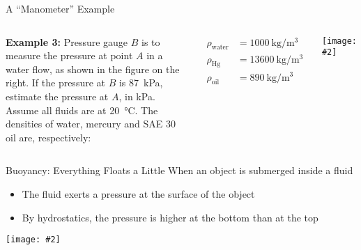 \documentclass[12pt,aspectratio=169]{beamer}
\newcommand{\pic}[2]{\texttt{[image: \#2]}}
\begin{document}
\begin{frame}{A ``Manometer'' Example}
  \begin{columns}
    \textbf{Example 3:} Pressure gauge $B$ is to measure the pressure at point
    $A$ in a water flow, as shown in the figure on the right. If the pressure at
    $B$ is \SI{87}{\kilo\pascal}, estimate the pressure at $A$, in
    \si{\kilo\pascal}. Assume all fluids are at \SI{20}{\celsius}. The
    densities of water, mercury and SAE 30 oil are, respectively:

    \vspace{-.3in}
    \begin{align*}
      \rho_\mathrm{water}&=\SI{1000}{\kilo\gram\per\metre^3}\\
      \rho_\mathrm{Hg}&=\SI{13600}{\kilo\gram\per\metre^3}\\
      \rho_\mathrm{oil}&=\SI{890}{\kilo\gram\per\metre^3}
    \end{align*}
    
    \pic{1}{mano.png}
  \end{columns}
\end{frame}



%
%    



\begin{frame}{Buoyancy: Everything Floats a Little}
  When an object is submerged inside a fluid
  \begin{itemize}
  \item The fluid exerts a pressure at the surface of the object
  \item By hydrostatics, the pressure is higher at the bottom than at the top
  \end{itemize}
  \begin{center}
    \pic{.3}{rock_fbvectors.png}
  \end{center}
\end{frame}
\end{document}
